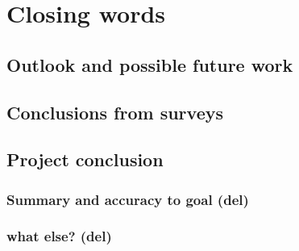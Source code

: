 
\chapter{Closing words}\label{chapter:outlook}

\section{Outlook and possible future work}
\section{Conclusions from surveys}
\section{Project conclusion}
\subsection{Summary and accuracy to goal (del)}
\subsection{what else? (del)}